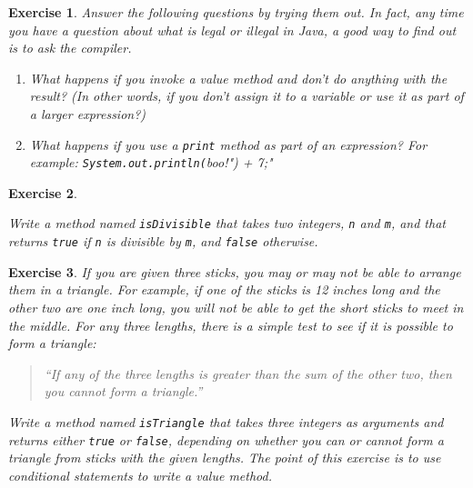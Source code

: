 \documentclass[12pt]{book}
\theoremstyle{exercise}
\newtheorem{exercise}{Exercise}[chapter]
\newcommand{\java}[1]{\verb"#1"}
\newcommand{\java}[1]{\lstinline{#1}} %
\begin{document}
\begin{exercise}

Answer the following questions by trying them out.
In fact, any time you have a question about what is legal or illegal in Java, a good way to find out is to ask the compiler.

\begin{enumerate}

\item What happens if you invoke a value method and don't do anything with the result?
(In other words, if you don't assign it to a variable or use it as part of a larger expression?)

\item What happens if you use a \java{print} method as part of an expression?
For example: \java{System.out.println("boo!") + 7;}


\end{enumerate}

\end{exercise}


\begin{exercise}
\label{ex.isdiv}

Write a method named \java{isDivisible} that takes two integers, \java{n} and \java{m}, and that returns \java{true} if \java{n} is divisible by \java{m}, and \java{false} otherwise.

\end{exercise}


\begin{exercise}

If you are given three sticks, you may or may not be able to arrange them in a triangle.
For example, if one of the sticks is 12 inches long and the other two are one inch long, you will not be able to get the short sticks to meet in the middle.
For any three lengths, there is a simple test to see if it is possible to form a triangle:

\begin{quote}
``If any of the three lengths is greater than the sum of the other two, then you cannot form a triangle.''
\end{quote}

Write a method named \java{isTriangle} that takes three integers as arguments and returns either \java{true} or \java{false}, depending on whether you can or cannot form a triangle from sticks with the given lengths.
The point of this exercise is to use conditional statements to write a value method.

\end{exercise}
\end{document}
